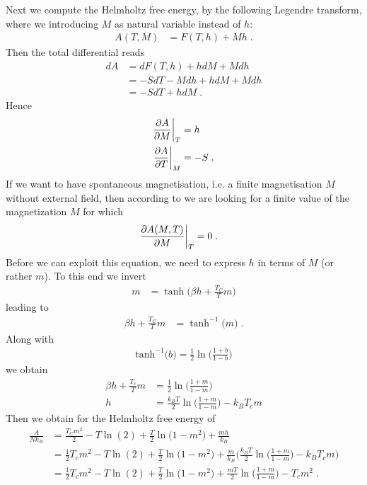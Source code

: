 Next we compute the Helmholtz free energy, by the following Legendre transform, where we introducing $M$ as  natural variable instead of $h$:
%
\begin{align}
A(T,M) &= F(T,h) + Mh\;.
\end{align}
%
Then the total differential reads
%
\begin{align*}
dA  &= dF(T,h) + h dM +M dh\\
&= -S dT - M dh + h dM +M dh  \\
&= -S dT + h dM\;.
\end{align*}
%
Hence 
%
\begin{align}\label{eq:MFA:dA:dM}
\frac{\partial A}{\partial M}\bigg|_{T} &= h\\
\frac{\partial A}{\partial T}\bigg|_{M} &= -S\;.\label{eq:MFA:S}
\end{align}
%
%
If we want to have spontaneous magnetisation,  i.e. a finite magnetisation $M$
without external field, then according to  we are looking for 
a finite value of the magnetization $M$ for which
%
\begin{align}\label{eq:MFA:dA:dM:zero}
\frac{\partial A(M,T)}{\partial M}\bigg|_{T} &= 0\;.
\end{align}
%
Before we can exploit this equation, we need to express $h$ in  terms of $M$ (or rather $m$).
To this end we invert 
%
\begin{align*}
m &= \tanh\bigg(\beta h + \frac{T_{C}}{T} m\bigg)
\end{align*}
%
leading to
%
\begin{align*}
\beta h + \frac{T_{C}}{T} m  &= \tanh^{-1}\big(m\big)\;.
\end{align*}
%
Along with 
\begin{align*}
\text{tanh}^{-1}\big(b\big)=\frac{1}{2}\ln\bigg( \frac{1+b}{1-b} \bigg)
\end{align*}
we obtain
%
\begin{align*}
\beta h +\frac{T_{c}}{T}m &= 
\frac{1}{2}\ln\bigg( \frac{1+m}{1-m} \bigg)\\
h &= \frac{k_{B}T}{2}\ln\bigg( \frac{1+m}{1-m} \bigg)
-k_{B}T_{c} m
\end{align*}
%
Then we obtain for the Helmholtz free energy of 
%
\begin{align*}
\frac{A}{N k_{B}} &= \frac{T_{C} m^{2}}{2} -T\ln(2) +\frac{T}{2} \ln\big( 1-m^{2} \big) + \frac{mh}{k_{B}}\\
 &=\frac{1}{2} T_{c} m^{2}
-  T\ln(2) + \frac{T}{2}\ln\big(1-m^{2} \big)
+ \frac{m }{k_{B}}
\bigg( \frac{k_{B}T}{2} \ln\bigg( \frac{1+m}{1-m} \bigg)
- k_{B}T_{c}m
\bigg)\\
 &=\frac{1}{2} T_{c} m^{2}
-  T\ln(2) + \frac{T}{2}\ln\big(1-m^{2} \big)
+
\frac{m T}{2}\ln\bigg( \frac{1+m}{1-m} \bigg)
- T_{c} m^{2}
\;.
\end{align*}
